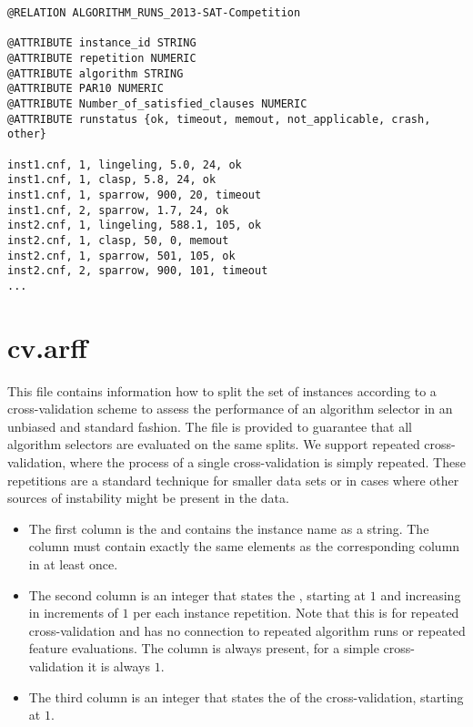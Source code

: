 \documentclass[]{elsarticle}
\begin{document}
\begin{lstlisting}[caption=Example algorithm\_runs.arff with four algorithms]
@RELATION ALGORITHM_RUNS_2013-SAT-Competition

@ATTRIBUTE instance_id STRING
@ATTRIBUTE repetition NUMERIC
@ATTRIBUTE algorithm STRING
@ATTRIBUTE PAR10 NUMERIC
@ATTRIBUTE Number_of_satisfied_clauses NUMERIC
@ATTRIBUTE runstatus {ok, timeout, memout, not_applicable, crash, other}

inst1.cnf, 1, lingeling, 5.0, 24, ok
inst1.cnf, 1, clasp, 5.8, 24, ok
inst1.cnf, 1, sparrow, 900, 20, timeout
inst1.cnf, 2, sparrow, 1.7, 24, ok
inst2.cnf, 1, lingeling, 588.1, 105, ok
inst2.cnf, 1, clasp, 50, 0, memout
inst2.cnf, 1, sparrow, 501, 105, ok
inst2.cnf, 2, sparrow, 900, 101, timeout
...
\end{lstlisting}


\section{cv.arff}

This file contains information how to split the set of instances according to a cross-validation
scheme to assess the performance of an algorithm selector in an unbiased and standard fashion.
The file is provided to guarantee that all algorithm selectors are evaluated on the same splits.
We support repeated cross-validation, where the process of a single cross-validation is simply 
repeated. These repetitions are a standard technique for smaller data sets or in cases 
where other sources of instability might be present in the data.

\begin{itemize}
  \item The first column is the  and contains the instance name as a string. 
  		The column must contain exactly the same elements as the corresponding column in
 		 at least once.
  \item The second column is an integer that states the , starting at $1$ and increasing 
		in increments of $1$ per each instance repetition. Note that this is for repeated 
                cross-validation and has no connection to repeated algorithm runs or repeated feature
                evaluations. The column is always present, for a simple cross-validation it is always $1$.
  \item The third column is an integer that states the  of the cross-validation, starting at $1$.
\end{itemize}
\end{document}

